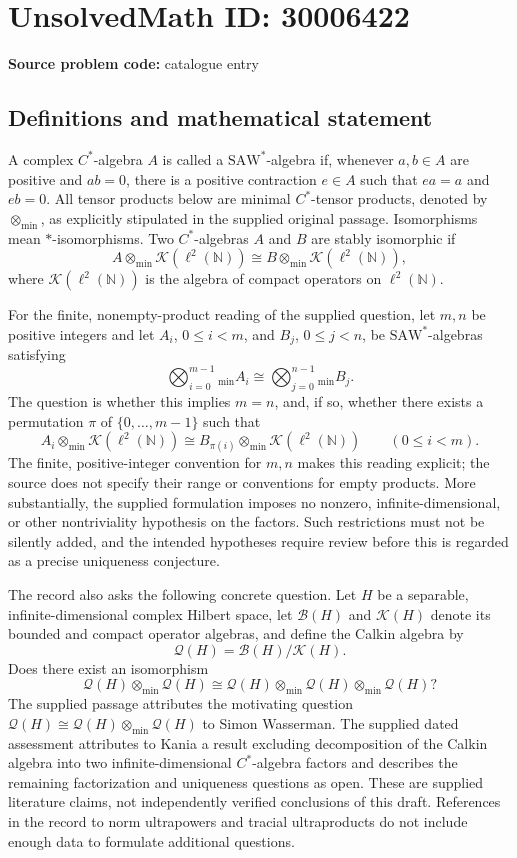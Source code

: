 \documentclass[11pt]{article}
\newcommand{\N}{\mathbb{N}}
\begin{document}
\section*{UnsolvedMath ID: 30006422}
\textbf{Source problem code:} catalogue entry
\subsection{Definitions and mathematical statement}
A complex \(C^*\)-algebra \(A\) is called a \(\mathrm{SAW}^*\)-algebra if, whenever \(a,b\in A\) are positive and \(ab=0\), there is a positive contraction \(e\in A\) such that \(ea=a\) and \(eb=0\). All tensor products below are minimal \(C^*\)-tensor products, denoted by \(\otimes_{\min}\), as explicitly stipulated in the supplied original passage. Isomorphisms mean \(*\)-isomorphisms. Two \(C^*\)-algebras \(A\) and \(B\) are stably isomorphic if
\[
A\otimes_{\min}\mathcal K(\ell^2(\N))\cong B\otimes_{\min}\mathcal K(\ell^2(\N)),
\]
where \(\mathcal K(\ell^2(\N))\) is the algebra of compact operators on \(\ell^2(\N)\).

For the finite, nonempty-product reading of the supplied question, let \(m,n\) be positive integers and let \(A_i\), \(0\leq i<m\), and \(B_j\), \(0\leq j<n\), be \(\mathrm{SAW}^*\)-algebras satisfying
\[
\bigotimes_{i=0}^{m-1}{}_{\min} A_i
\cong
\bigotimes_{j=0}^{n-1}{}_{\min} B_j.
\]
The question is whether this implies \(m=n\), and, if so, whether there exists a permutation \(\pi\) of \(\{0,\ldots,m-1\}\) such that
\[
A_i\otimes_{\min}\mathcal K(\ell^2(\N))
\cong
B_{\pi(i)}\otimes_{\min}\mathcal K(\ell^2(\N))
\qquad(0\leq i<m).
\]
The finite, positive-integer convention for \(m,n\) makes this reading explicit; the source does not specify their range or conventions for empty products. More substantially, the supplied formulation imposes no nonzero, infinite-dimensional, or other nontriviality hypothesis on the factors. Such restrictions must not be silently added, and the intended hypotheses require review before this is regarded as a precise uniqueness conjecture.

The record also asks the following concrete question. Let \(H\) be a separable, infinite-dimensional complex Hilbert space, let \(\mathcal B(H)\) and \(\mathcal K(H)\) denote its bounded and compact operator algebras, and define the Calkin algebra by
\[
\mathcal Q(H)=\mathcal B(H)/\mathcal K(H).
\]
Does there exist an isomorphism
\[
\mathcal Q(H)\otimes_{\min}\mathcal Q(H)
\cong
\mathcal Q(H)\otimes_{\min}\mathcal Q(H)\otimes_{\min}\mathcal Q(H)?
\]
The supplied passage attributes the motivating question \(\mathcal Q(H)\cong\mathcal Q(H)\otimes_{\min}\mathcal Q(H)\) to Simon Wasserman. The supplied dated assessment attributes to Kania a result excluding decomposition of the Calkin algebra into two infinite-dimensional \(C^*\)-algebra factors and describes the remaining factorization and uniqueness questions as open. These are supplied literature claims, not independently verified conclusions of this draft. References in the record to norm ultrapowers and tracial ultraproducts do not include enough data to formulate additional questions.
\end{document}
